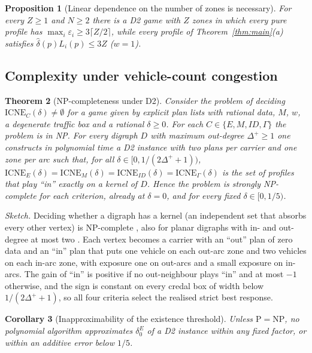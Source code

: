 \documentclass[preprint,12pt]{elsarticle}
\newtheorem{theorem}{Theorem}
\newtheorem{proposition}[theorem]{Proposition}
\newtheorem{corollary}[theorem]{Corollary}
\theoremstyle{definition}
\theoremstyle{remark}
\newcommand{\ICNE}{\mathrm{ICNE}}
\begin{document}
\begin{proposition}[Linear dependence on the number of zones is necessary]\label{prop:cycles}
For every $Z\ge1$ and $N\ge2$ there is a D2 game with $Z$ zones in which every pure profile has $\max_i\varepsilon_i\ge3\lceil Z/2\rceil$, while every profile of Theorem~\ref{thm:main}(a) satisfies $\hat\delta(p)L_i(p)\le3Z$ ($w=1$).
\end{proposition}

\subsection{Complexity under vehicle-count congestion}

\begin{theorem}[NP-completeness under D2]\label{thm:np}
Consider the problem of deciding $\ICNE_C(\delta)\neq\emptyset$ for a game given by explicit plan lists with rational data, $M$, $w$, a degenerate traffic box and a rational $\delta\ge0$. For each $C\in\{E,M,ID,\Gamma\}$ the problem is in NP. For every digraph $D$ with maximum out-degree $\Delta^+\ge1$ one constructs in polynomial time a D2 instance with two plans per carrier and one zone per arc such that, for all $\delta\in[0,1/(2\Delta^++1))$, $\ICNE_E(\delta)=\ICNE_M(\delta)=\ICNE_{ID}(\delta)=\ICNE_\Gamma(\delta)$ is the set of profiles that play ``in'' exactly on a kernel of $D$. Hence the problem is strongly NP-complete for each criterion, already at $\delta=0$, and for every fixed $\delta\in[0,1/5)$.
\end{theorem}

\emph{Sketch.} Deciding whether a digraph has a kernel (an independent set that absorbs every other vertex) is NP-complete \citep{Chvatal1973}, also for planar digraphs with in- and out-degree at most two \citep{Fraenkel1981}. Each vertex becomes a carrier with an ``out'' plan of zero data and an ``in'' plan that puts one vehicle on each out-arc zone and two vehicles on each in-arc zone, with exposure one on out-arcs and a small exposure on in-arcs. The gain of ``in'' is positive if no out-neighbour plays ``in'' and at most $-1$ otherwise, and the sign is constant on every credal box of width below $1/(2\Delta^++1)$, so all four criteria select the realised strict best response.

\begin{corollary}[Inapproximability of the existence threshold]\label{cor:inapprox}
Unless $\mathrm P=\mathrm{NP}$, no polynomial algorithm approximates $\delta_0^E$ of a D2 instance within any fixed factor, or within an additive error below $1/5$.
\end{corollary}
\end{document}
